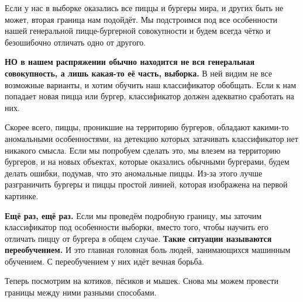 \documentclass[12pt, a4paper, oneside]{article}
\theoremstyle{plain} %
\theoremstyle{definition}
\newcommand{\indef}[1]{\textbf{ \color{green} #1}}
\begin{document}
\begin{solution}
Если у нас в выборке оказались все пиццы и бургеры мира, и других быть не может, вторая граница нам подойдёт. Мы подстроимся под все особенности нашей генеральной пицце-бургерной совокупности и будем всегда чётко и безошибочно отличать одно от другого. 

\indef{НО в нашем распряжении обычно находится не вся генеральная совокупность, а лишь какая-то её часть, выборка.} В ней видим не все возможные варианты, и хотим обучить наш классификатор обобщать. Если к нам попадает новая пицца или бургер, классификатор должен адекватно сработать на них. 

Скорее всего, пиццы, проникшие на территорию бургеров, обладают какими-то аномальными особенностями, на детекцию которых затачивать классификатор нет никакого смысла. Если мы попробуем сделать это, мы влезем на территорию бургеров, и на новых объектах, которые оказались обычными бургерами, будем делать ошибки, подумав, что это аномальные пиццы. Из-за этого лучше разграничить бургеры и пиццы простой линией, которая изображена на первой картинке.

\indef{Ещё раз, ещё раз.} Если мы проведём подробную границу, мы заточим классификатор под особенности выборки, вместо того, чтобы научить его отличать пиццу от бургера в общем случае. \indef{Такие ситуации называются переобучением.} И это главная головная боль людей, занимающихся машинным обучением. С переобучением у них идёт вечная борьба. 

Теперь посмотрим на котиков, пёсиков и мышек. Снова мы можем провести границы между ними разными способами.
	

\end{solution}
\end{document}
